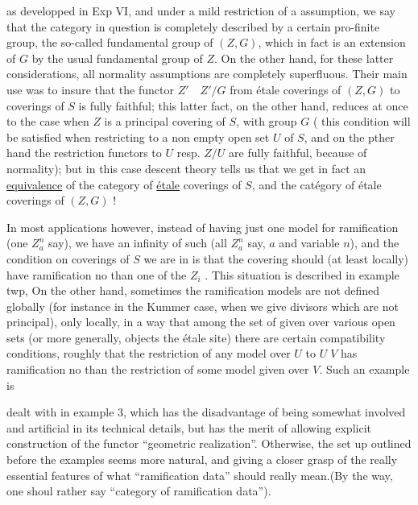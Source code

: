 as developped in Exp VI, and under a mild restriction  of a  assumption, we  say that the category in question is  completely described by a certain pro-finite group, the so-called fundamental group of $(Z,G)$, which in fact is an extension of $G$ by the usual fundamental group of $Z$. On the other hand, for these latter considerations, all normality assumptions are completely superfluous. Their main use was to insure that the functor $Z'\quad Z'/G$ from étale coverings of $(Z,G)$ to coverings of $S$ is fully faithful; this latter fact, on the other hand, reduces at once to the case when $Z$ is a principal covering of $S$, with group $G$ ( this condition will be satisfied when restricting to a non empty open set $U$ of $S$, and on the pther hand the restriction functors  to $U$ resp. $Z/U$ are fully faithful, because of normality); but in this case descent theory tells us that we get in fact an \uline{equivalence} of the category of \uline{étale} coverings of $S$, and the catégory of étale coverings of $(Z,G)$ !

In most applications however, instead of having just one model for ramification (one $Z_a^n$ say), we have an infinity of such (all $Z_a^n$ say,  $a$ and variable $n$), and the condition on coverings  of $S$ we are  in is that the covering should (at least locally) have ramification no  than one of the $Z_i$ . This situation is described in example twp, On the other hand, sometimes the ramification models are not defined globally (for instance in the Kummer case, when we give  divisors which are not principal), only locally, in a way that among the set of  given over various open sets (or more generally, objects  the étale site) there are certain compatibility conditions, roughly that the restriction of any model over $U$ to $U\;V$ has ramification no  than the restriction of some model given over $V$. Such an example is

dealt with in example 3, which has the disadvantage of being somewhat involved and artificial in its technical details, but has the merit of allowing explicit construction of the functor ``geometric realization''. Otherwise, the set up outlined before the examples seems more natural, and giving a closer grasp of the  really essential features of what ``ramification data'' should really mean.(By the way, one shoul rather say ``category of ramification data'').


